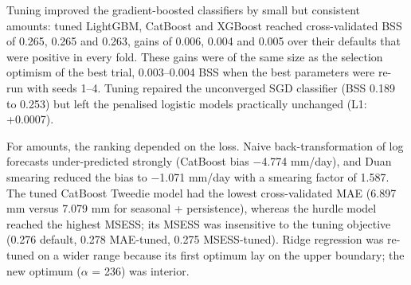 \documentclass[
]{article}
\begin{document}
Tuning improved the gradient-boosted classifiers by small but consistent amounts: tuned LightGBM, CatBoost and XGBoost reached cross-validated BSS of 0.265, 0.265 and 0.263, gains of 0.006, 0.004 and 0.005 over their defaults that were positive in every fold.  %
These gains were of the same size as the selection optimism of the best trial, 0.003--0.004 BSS when the best parameters were re-run with seeds 1--4.  %
Tuning repaired the unconverged SGD classifier (BSS 0.189 to 0.253) but left the penalised logistic models practically unchanged (L1: +0.0007).  %

For amounts, the ranking depended on the loss. Naive back-transformation of log forecasts under-predicted strongly (CatBoost bias $-$4.774 mm/day), and Duan smearing reduced the bias to $-$1.071 mm/day with a smearing factor of 1.587.  %
The tuned CatBoost Tweedie model had the lowest cross-validated MAE (6.897 mm versus 7.079 mm for seasonal + persistence), whereas the hurdle model reached the highest MSESS; its MSESS was insensitive to the tuning objective (0.276 default, 0.278 MAE-tuned, 0.275 MSESS-tuned).  %
Ridge regression was re-tuned on a wider range because its first optimum lay on the upper boundary; the new optimum ($\alpha$ = 236) was interior.  %
\end{document}
